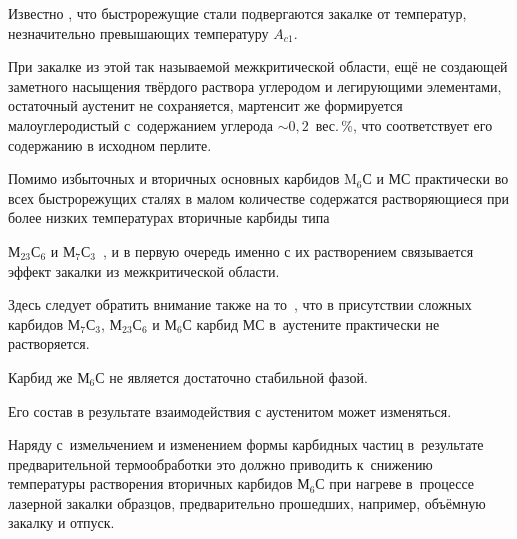 Известно \cite{gureev:bib5}, что быстрорежущие стали подвергаются закалке от температур, незначительно превышающих температуру $A_{c1}$. 

При закалке из этой так называемой межкритической области, ещё не создающей заметного насыщения твёрдого раствора углеродом и легирующими элементами, остаточный аустенит не сохраняется, мартенсит же формируется малоуглеродистый с~содержанием углерода $\sim 0,2$~вес.\,\%, что соответствует его содержанию в исходном перлите. 

Помимо избыточных и вторичных основных карбидов M$_6$С и МС практически во всех быстрорежущих сталях в малом количестве содержатся растворяющиеся при более низких температурах вторичные карбиды типа

М$_{23}$С$_6$ и М$_7$С$_3$~\cite{gureev:bib5,gureev:bib6}, и в первую очередь именно с их растворением связывается эффект закалки из межкритической области. 

Здесь следует обратить внимание также на то~\cite{gureev:bib5}, что в присутствии сложных карбидов М$_7$С$_3$, М$_{23}$С$_6$ и М$_6$С карбид МС в~аустените практически не растворяется. 

Карбид же М$_6$С не является достаточно стабильной фазой. 

Его состав в результате взаимодействия с аустенитом может изменяться. 

Наряду с~измельчением и изменением формы карбидных частиц в~результате предварительной термообработки это должно приводить к~снижению температуры растворения вторичных карбидов М$_6$С при нагреве в~процессе лазерной закалки образцов, предварительно прошедших, например, объёмную закалку и отпуск.







